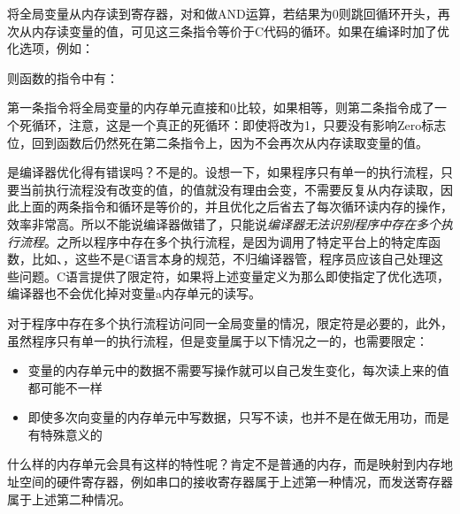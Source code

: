 

将全局变量从内存读到寄存器，对和做AND运算，若结果为0则跳回循环开头，再次从内存读变量的值，可见这三条指令等价于C代码的循环。如果在编译时加了优化选项，例如：




则函数的指令中有：




第一条指令将全局变量的内存单元直接和0比较，如果相等，则第二条指令成了一个死循环，注意，这是一个真正的死循环：即使将改为1，只要没有影响Zero标志位，回到函数后仍然死在第二条指令上，因为不会再次从内存读取变量的值。



是编译器优化得有错误吗？不是的。设想一下，如果程序只有单一的执行流程，只要当前执行流程没有改变的值，的值就没有理由会变，不需要反复从内存读取，因此上面的两条指令和循环是等价的，并且优化之后省去了每次循环读内存的操作，效率非常高。所以不能说编译器做错了，只能说\emph{编译器无法识别程序中存在多个执行流程}。之所以程序中存在多个执行流程，是因为调用了特定平台上的特定库函数，比如、，这些不是C语言本身的规范，不归编译器管，程序员应该自己处理这些问题。C语言提供了限定符，如果将上述变量定义为那么即使指定了优化选项，编译器也不会优化掉对变量a内存单元的读写。



对于程序中存在多个执行流程访问同一全局变量的情况，限定符是必要的，此外，虽然程序只有单一的执行流程，但是变量属于以下情况之一的，也需要限定：


\begin{itemize}

\item 变量的内存单元中的数据不需要写操作就可以自己发生变化，每次读上来的值都可能不一样

\item 即使多次向变量的内存单元中写数据，只写不读，也并不是在做无用功，而是有特殊意义的
\end{itemize}


什么样的内存单元会具有这样的特性呢？肯定不是普通的内存，而是映射到内存地址空间的硬件寄存器，例如串口的接收寄存器属于上述第一种情况，而发送寄存器属于上述第二种情况。



